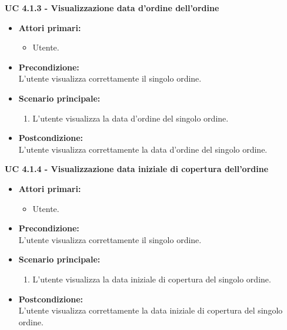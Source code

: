 \vspace{0.5cm}

\noindent \textbf{\large UC 4.1.3 - Visualizzazione data d'ordine dell'ordine}
\label{uc:visualizzazione-data-ordine}
\begin{itemize}

	\item \textbf{Attori primari: }
		\begin{itemize}
			\item Utente.
		\end{itemize}

	\item \textbf{Precondizione: }\\[0.3cm]
		L'utente visualizza correttamente il singolo ordine.

	\item \textbf{Scenario principale: }
		\begin{enumerate}
			\item L'utente visualizza la data d'ordine del singolo ordine.
		\end{enumerate}
		

	\item \textbf{Postcondizione: }\\[0.3cm]
		L'utente visualizza correttamente la data d'ordine del singolo ordine.

\end{itemize}

\vspace{0.5cm}

\noindent \textbf{\large UC 4.1.4 - Visualizzazione data iniziale di copertura dell'ordine}
\label{uc:visualizzazione-data-iniziale-copertura}
\begin{itemize}

	\item \textbf{Attori primari: }
		\begin{itemize}
			\item Utente.
		\end{itemize}

	\item \textbf{Precondizione: }\\[0.3cm]
		L'utente visualizza correttamente il singolo ordine.

	\item \textbf{Scenario principale: }
		\begin{enumerate}
			\item L'utente visualizza la data iniziale di copertura del singolo ordine.
		\end{enumerate}
		

	\item \textbf{Postcondizione: }\\[0.3cm]
		L'utente visualizza correttamente la data iniziale di copertura del singolo ordine.

\end{itemize}


